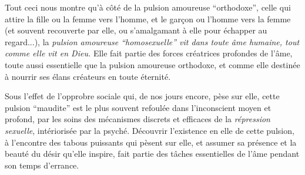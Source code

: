 Tout ceci nous montre qu'à côté de la pulsion amoureuse ``orthodoxe'', celle qui attire la fille ou la femme vers l'homme, et le garçon ou l'homme vers la femme (et souvent recouverte par elle, ou s'amalgamant à elle pour échapper au regard...), la \textit{pulsion amoureuse ``homosexuelle'' vit dans toute âme humaine, tout comme elle vit en Dieu.} Elle fait partie des forces créatrices profondes de l'âme, toute aussi essentielle que la pulsion amoureuse orthodoxe, et comme elle destinée à nourrir ses élans créateurs en toute éternité.

Sous l'effet de l'opprobre sociale qui, de nos jours encore, pèse sur elle, cette pulsion ``maudite'' est le plus souvent refoulée dans l'inconscient moyen et profond, par les soins des mécanismes discrets et efficaces de la \textit{répression sexuelle}, intériorisée par la psyché. Découvrir l'existence en elle de cette pulsion, à l'encontre des tabous puissants qui pèsent sur elle, et assumer sa présence et la beauté du désir qu'elle inspire, fait partie des tâches essentielles de l'âme pendant son temps d'errance.

